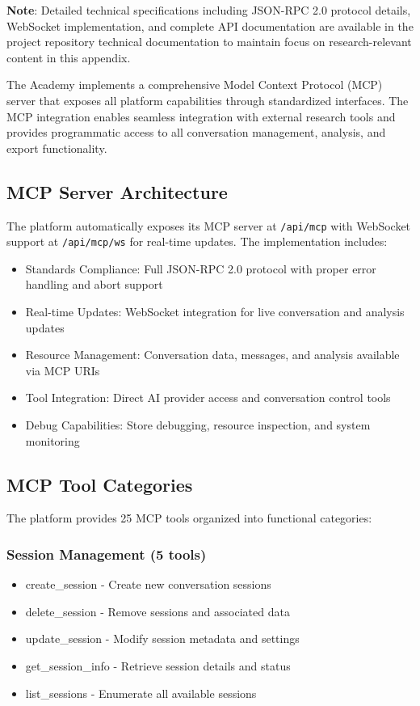 \documentclass[11pt,letterpaper]{article}
\newcommand{\theacademy}{The Academy}
\begin{document}
\textbf{Note}: Detailed technical specifications including JSON-RPC 2.0 protocol details, WebSocket implementation, and complete API documentation are available in the project repository technical documentation to maintain focus on research-relevant content in this appendix.

\theacademy{} implements a comprehensive Model Context Protocol (MCP) server that exposes all platform capabilities through standardized interfaces. The MCP integration enables seamless integration with external research tools and provides programmatic access to all conversation management, analysis, and export functionality.

\subsection{MCP Server Architecture}

The platform automatically exposes its MCP server at \texttt{/api/mcp} with WebSocket support at \texttt{/api/mcp/ws} for real-time updates. The implementation includes:

\begin{itemize}
    \item Standards Compliance: Full JSON-RPC 2.0 protocol with proper error handling and abort support
    \item Real-time Updates: WebSocket integration for live conversation and analysis updates
    \item Resource Management: Conversation data, messages, and analysis available via MCP URIs
    \item Tool Integration: Direct AI provider access and conversation control tools
    \item Debug Capabilities: Store debugging, resource inspection, and system monitoring
\end{itemize}

\subsection{MCP Tool Categories}

The platform provides 25 MCP tools organized into functional categories:

\subsubsection{Session Management (5 tools)}
\begin{itemize}
    \item create\_session - Create new conversation sessions
    \item delete\_session - Remove sessions and associated data
    \item update\_session - Modify session metadata and settings
    \item get\_session\_info - Retrieve session details and status
    \item list\_sessions - Enumerate all available sessions
\end{itemize}
\end{document}
